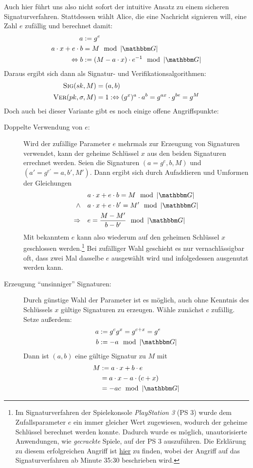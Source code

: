 Auch hier führt uns also nicht sofort der intuitive Ansatz zu einem sicheren Signaturverfahren. Stattdessen wählt Alice, die eine Nachricht
signieren will, eine Zahl $e$ zufällig und berechnet damit:
\begin{align*}
a &:= g^e\\
a \cdot x + e \cdot b &= M \mod \left|\G\right|\\
\Leftrightarrow b &:= (M - a \cdot x) \cdot e^{-1} \mod \left|\G\right|
\end{align*}
Daraus ergibt sich dann als Signatur- und Verifikationsalgorithmen:
\begin{align*}
\textsc{Sig}(sk,M) &= (a, b)\\
\textsc{Ver}(pk,\sigma,M) &= 1 :\Leftrightarrow (g^x)^a \cdot a^b = g^{ax} \cdot g^{be} = g^M
\end{align*}
Doch auch bei dieser Variante gibt es noch einige offene Angriffspunkte:
\begin{description}
	\item[Doppelte Verwendung von $e$:]
	Wird der zufällige Parameter $e$ mehrmals zur Erzeugung von Signaturen verwendet, kann der geheime Schlüssel $x$ aus den beiden Signaturen
	errechnet werden. Seien die Signaturen $(a = g^e, b, M)$ und $(a' = g^{e'} = a, b', M')$. Dann ergibt sich durch Aufaddieren und Umformen
	der Gleichungen
	\begin{align*}
	&a \cdot x + e \cdot b = M \mod \left|\G\right|\\
	\land \quad &a \cdot x + e \cdot b' = M' \mod \left|\G\right|\\
	\Rightarrow \quad &e = \frac{M - M'}{b - b'} \mod \left|\G\right|
	\end{align*}
	Mit bekanntem $e$ kann also wiederum auf den geheimen Schlüssel $x$ geschlossen werden.\footnote{Im Signaturverfahren der Spielekonsole \textit{PlayStation 3} (PS 3) wurde dem Zufallsparameter $e$ ein immer gleicher Wert zugewiesen, wodurch der geheime Schlüssel berechnet werden konnte. Dadurch wurde es möglich, unautorisierte Anwendungen, wie \textit{gecrackte} Spiele, auf der PS 3 auszuführen. Die Erklärung zu diesem erfolgreichen Angriff ist \href{https://www.youtube.com/watch?v=4loZGYqaZ7I}{hier} zu finden, wobei der Angriff auf das Signaturverfahren ab Minute 35:30 beschrieben wird.} Bei zufälliger Wahl geschieht es nur vernachlässigbar oft, dass zwei Mal dasselbe $e$ ausgewählt wird und infolgedessen ausgenutzt werden kann.
	\item[Erzeugung "`unsinniger"' Signaturen:]
	Durch günstige Wahl der Parameter ist es möglich, auch ohne Kenntnis des Schlüssels $x$ gültige Signaturen zu erzeugen. Wähle zunächst $c$
	zufällig. Setze außerdem:
	\begin{align*}
	a &:= g^cg^x = g^{c+x} = g^e\\
	b &:= -a \mod \left|\G\right|
	\end{align*}
	Dann ist $(a, b)$ eine gültige Signatur zu $M$ mit
	\begin{align*}
	M &:= a \cdot x + b \cdot e\\
	&= a \cdot x - a \cdot (c + x)\\
	&= -ac \mod \left|\G\right|
	\end{align*}
\end{description}

